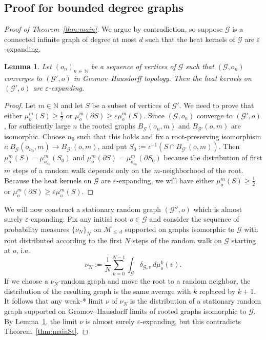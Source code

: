 \documentclass[10pt]{amsart}
\newtheorem{lemm}[theo]{Lemma}\newtheorem{prop}[theo]{Proposition}\newtheorem{coro}[theo]{Corollary}\newtheorem{conj}[theo]{Conjecture}
\theoremstyle{definition}\newtheorem{defi}[theo]{Definition}\newtheorem{rema}[theo]{Remark}\newtheorem{exam}[theo]{Example}\newtheorem{exem}[theo]{Example}\newtheorem{nota}[theo]{Notation}
\newcommand{\bbN}{\mathbb{N}}
\newcommand{\calM}{\mathcal{M}}
\newcommand{\calG}{\mathcal{G}}
\begin{document}
\subsection{Proof for bounded degree graphs} \label{sec:graph_proof}

\begin{proof}[Proof of Theorem~\ref{thm:main}] We argue by contradiction, so suppose $\calG$ is a connected infinite graph of degree at most $d$ such that the heat kernels of $\calG$ are $\varepsilon$-expanding.

\begin{lemm}\label{lem:GHlimit}
Let $(o_n)_{n\,\in\,\bbN}$ be a sequence of vertices of $\calG$ such that $(\calG,o_n)$ converges to $(\calG',o)$ in Gromov--Hausdorff topology. Then the heat kernels on $(\calG',o)$ are $\varepsilon$-expanding.
\end{lemm}

\begin{proof}
Let $m\in\bbN$ and let $S$ be a subset of vertices of $\calG'$. We need to prove that either $\mu_o^m(S)\geq \frac{1}{2}$ or $\mu_o^m(\partial S)\geq \varepsilon \mu_o^m(S).$ Since $(\calG,o_n)$ converge to $(\calG',o)$, for sufficiently large $n$ the rooted graphs $B_{\calG}(o_n,m)$ and $B_{\calG'}(o,m)$ are isomorphic. Choose $n_0$ such that this holds and fix a root-preserving isomorphism $\iota: B_{\calG}(o_{n_0},m) \to B_{\calG'}(o,m)$, and put $S_0:=\iota^{-1}(S\cap B_{\calG'}(o,m)).$ Then $\mu_o^m(S)=\mu_{o_{n_0}}^m(S_0)$ and $\mu_o^m(\partial S)=\mu_{o_{n_0}}^m(\partial S_0)$ because the distribution of first $m$ steps of a random walk depends only on the $m$-neighborhood of the root. Because the heat kernels on $\calG$ are $\varepsilon$-expanding, we will have either $\mu_o^m(S)\geq \frac{1}{2}$ or $\mu_o^m(\partial S)\geq \varepsilon \mu_o^m(S).$
\end{proof}

We will now construct a stationary random graph $(\calG'',o)$ which is almost surely $\varepsilon$-expanding. Fix any initial root $o\in \calG$ and consider the sequence of probability measures $\{\nu_N\}_N$ on $\calM_{\leq\,d}$ supported on graphs isomorphic to $\calG$ with root distributed according to the first $N$ steps of the random walk on $\calG$ starting at $o$, i.e.
\[
\nu_N:=\frac{1}{N}\sum_{k=0}^{N-1} \int_{\calG}\delta_{\calG,v} \, d\mu_{o}^{k}(v).
\]
If we choose a $\nu_N$-random graph and move the root to a random neighbor, the distribution of the resulting graph is the same average with $k$ replaced by $k+1$. It follows that any weak-* limit $\nu$ of $\nu_N$ is the distribution of a stationary random graph supported on Gromov--Hausdorff limits of rooted graphs isomorphic to $\calG$. By Lemma~\ref{lem:GHlimit}, the limit $\nu$ is almost surely $\varepsilon$-expanding, but this contradicts Theorem~\ref{thm:mainSt}.
\end{proof}
\end{document}
